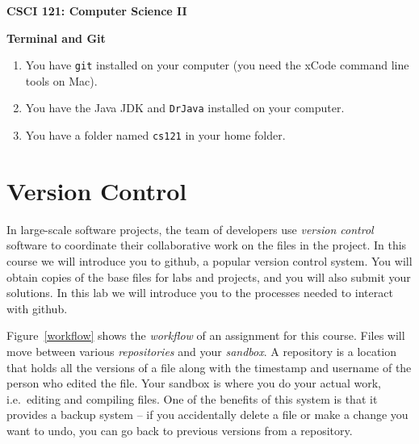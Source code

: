 \documentclass[11pt]{article}
\begin{document}
\centerline{\Large\bf CSCI 121: Computer Science II}

\vspace{.1in}

\centerline{\large\bf Terminal and Git}

\vspace{.25in}


\begin{enumerate}
\item You have {\tt git} installed on your computer (you need the xCode command line tools on Mac).
\item You have the Java JDK and {\tt DrJava} installed on your computer.
\item You have a folder named {\tt cs121} in your home folder.
\end{enumerate}


\section*{Version Control}

In large-scale software projects, the team of developers use {\em version control} software to coordinate their collaborative work on the files in the project.  In this course we will introduce you to github, a popular version control system.  You will obtain copies of the base files for labs and projects, and you will also submit your solutions.  In this lab we will introduce you to the processes needed to interact with github.

Figure~\ref{workflow} shows the {\em workflow} of an assignment for this course.  Files will move between various {\em repositories} and your {\em sandbox}.  A repository is a location that holds all the versions of a file along with the timestamp and username of the person who edited the file.  Your sandbox is where you do your actual work, i.e.~editing and compiling files.  One of the benefits of this system is that it provides a backup system -- if you accidentally delete a file or make a change you want to undo, you can go back to previous versions from a repository.
\end{document}
